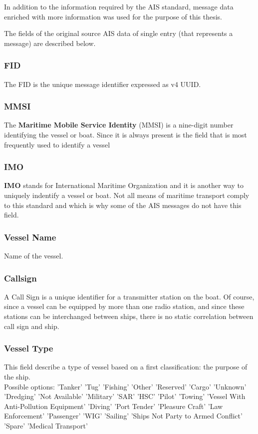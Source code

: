     In addition to the information required by the AIS standard, message data enriched with more information was used for the purpose of this thesis.
    
    The fields of the original source AIS data of single entry (that represents a message) are described below.

        \subsubsection{FID}
            The FID is the unique message identifier expressed as v4 UUID.
        \subsubsection{MMSI}
            The \textbf{Maritime Mobile Service Identity} (MMSI) is a nine-digit number identifying the vessel or boat. Since it is always present is the field that is most frequently used to identify a vessel
        \subsubsection{IMO}
            \textbf{IMO} stands for International Maritime Organization and it is another way to uniquely indentify a vessel or boat. Not all means of maritime transport comply to this standard and which is why some of the AIS messages do not have this field.
        \subsubsection{Vessel Name}
            Name of the vessel.
        \subsubsection{Callsign}
            A Call Sign is a unique identifier for a transmitter station on the boat. Of course, since a vessel can be equipped by more than one radio station, and since these stations can be interchanged between ships, there is no static correlation between call sign and ship.
        \subsubsection{Vessel Type}
            This field describe a type of vessel based on a first classification: the purpose of the ship. \\
            Possible options: 'Tanker' 'Tug' 'Fishing' 'Other' 'Reserved' 'Cargo' 'Unknown' 'Dredging' 'Not Available' 'Military' 'SAR' 'HSC' 'Pilot' 'Towing' 'Vessel With Anti-Pollution Equipment' 'Diving' 'Port Tender' 'Pleasure Craft' 'Law Enforcement' 'Passenger' 'WIG' 'Sailing' 'Ships Not Party to Armed Conflict' 'Spare' 'Medical Transport'
